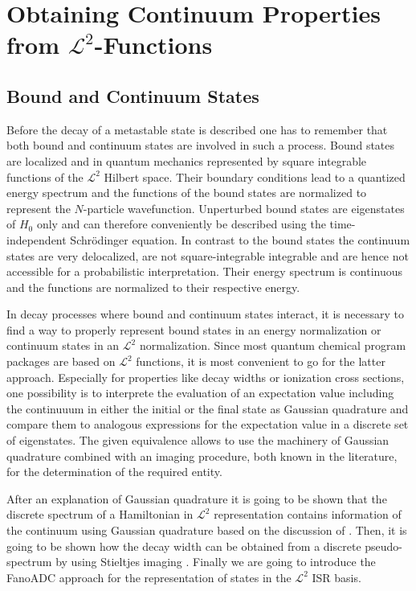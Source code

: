 \chapter[Continuum Properties from $\mathcal{L}^2$ Functions]{Obtaining Continuum Properties from $\mathcal{L}^2$-Functions}
\label{chapter:L2}


\section{Bound and Continuum States}
Before the decay of a metastable state is described one has to remember
that both bound and continuum states are involved in such a process.
Bound states are localized and in quantum mechanics
represented by square integrable
functions of the $\mathcal{L}^2$ Hilbert space. Their boundary conditions
lead to a quantized energy spectrum and the functions of the bound states
are normalized
to represent the $N$-particle wavefunction.
Unperturbed bound states are eigenstates of $H_0$ only
and can therefore conveniently be described using the time-independent
Schrödinger equation.
In contrast to the bound states the
continuum states are very delocalized, are not square-integrable
integrable and are hence not accessible for a probabilistic interpretation.
Their energy spectrum is continuous and the functions are normalized to
their respective energy.

In decay processes
where bound and continuum states interact, it is necessary to find a way to
properly represent bound states in an energy normalization or continuum states
in an $\mathcal{L}^2$ normalization.
Since most quantum chemical program packages are based
on $\mathcal{L}^2$ functions,
it is most convenient to go for the latter approach.
Especially for properties like decay widths or ionization cross sections, one
possibility is to interprete the evaluation of an expectation value
including the continuuum in either the initial or the final state as
Gaussian quadrature and compare them to analogous expressions for the
expectation value in a discrete set of eigenstates. The given equivalence
allows to use the machinery of Gaussian quadrature combined with an imaging
procedure, both known in the literature,
for the determination of the required entity. \cite{Reinhardt79}

After an explanation of Gaussian quadrature it is going to be shown that
the discrete spectrum of a Hamiltonian in $\mathcal{L}^2$ representation
contains information of the continuum using Gaussian quadrature
based on the discussion of \cite{Reinhardt79}.
Then, it is going to be shown how the decay width can be obtained from a
discrete pseudo-spectrum by using Stieltjes imaging \cite{Langhoff76,Corcoran77}.
Finally we are going to introduce the FanoADC approach for the representation of
states in the $\mathcal{L}^2$ \ac{ISR} basis.



